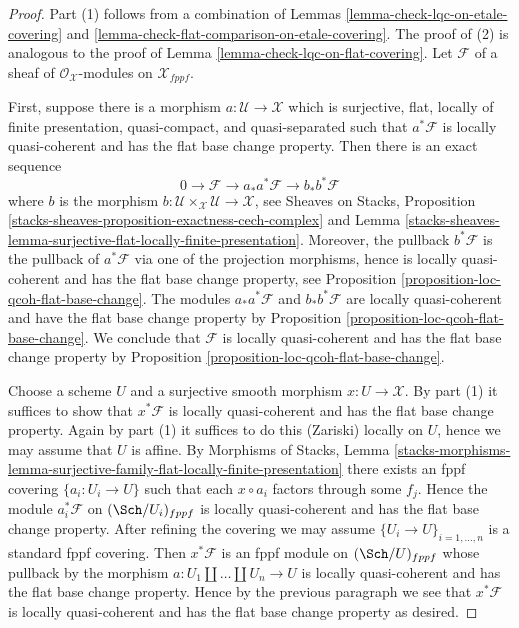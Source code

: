 \begin{proof}
Part (1) follows from a combination of
Lemmas \ref{lemma-check-lqc-on-etale-covering} and
\ref{lemma-check-flat-comparison-on-etale-covering}.
The proof of (2) is analogous to the proof of
Lemma \ref{lemma-check-lqc-on-flat-covering}.
Let $\mathcal{F}$ of a sheaf of $\mathcal{O}_\mathcal{X}$-modules
on $\mathcal{X}_{fppf}$.

\medskip\noindent
First, suppose there is a morphism $a : \mathcal{U} \to \mathcal{X}$
which is surjective, flat, locally of finite presentation, quasi-compact,
and quasi-separated such that $a^*\mathcal{F}$ is locally quasi-coherent
and has the flat base change property.
Then there is an exact sequence
$$
0 \to \mathcal{F} \to a_*a^*\mathcal{F} \to b_*b^*\mathcal{F}
$$
where $b$ is the morphism
$b : \mathcal{U} \times_\mathcal{X} \mathcal{U} \to \mathcal{X}$, see
Sheaves on Stacks, Proposition
\ref{stacks-sheaves-proposition-exactness-cech-complex} and
Lemma \ref{stacks-sheaves-lemma-surjective-flat-locally-finite-presentation}.
Moreover, the pullback $b^*\mathcal{F}$ is the pullback of $a^*\mathcal{F}$
via one of the projection morphisms, hence is locally quasi-coherent
and has the flat base change property, see
Proposition \ref{proposition-loc-qcoh-flat-base-change}.
The modules $a_*a^*\mathcal{F}$ and $b_*b^*\mathcal{F}$ are locally
quasi-coherent and have the flat base change property by
Proposition \ref{proposition-loc-qcoh-flat-base-change}.
We conclude that $\mathcal{F}$ is locally quasi-coherent and
has the flat base change property by
Proposition \ref{proposition-loc-qcoh-flat-base-change}.

\medskip\noindent
Choose a scheme $U$ and a surjective smooth morphism $x : U \to \mathcal{X}$.
By part (1) it suffices to show that $x^*\mathcal{F}$ is locally
quasi-coherent and has the flat base change property.
Again by part (1) it suffices to do this (Zariski) locally on $U$,
hence we may assume that $U$ is affine. By
Morphisms of Stacks, Lemma
\ref{stacks-morphisms-lemma-surjective-family-flat-locally-finite-presentation}
there exists an fppf covering $\{a_i : U_i \to U\}$ such that
each $x \circ a_i$ factors through some $f_j$. Hence the module
$a_i^*\mathcal{F}$ on $(\Sch/U_i)_{fppf}$
is locally quasi-coherent and has the flat base change property.
After refining the covering we may assume $\{U_i \to U\}_{i = 1, \ldots, n}$
is a standard fppf covering. Then $x^*\mathcal{F}$ is an fppf
module on $(\Sch/U)_{fppf}$ whose pullback by the morphism
$a : U_1 \amalg \ldots \amalg U_n \to U$ is locally quasi-coherent
and has the flat base change property.
Hence by the previous paragraph we see that $x^*\mathcal{F}$ is locally
quasi-coherent and has the flat base change property as desired.
\end{proof}







